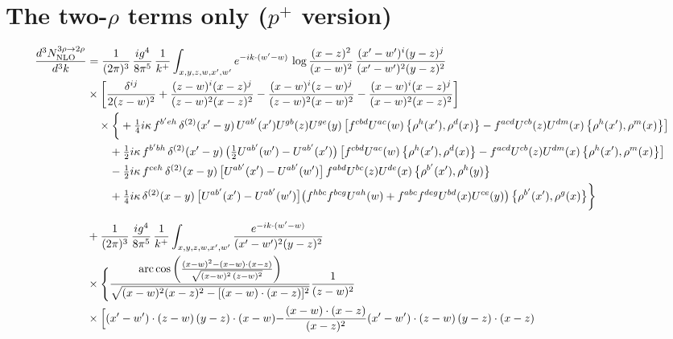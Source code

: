 \documentclass[10pt]{article}
\numberwithin{equation}{section}
\begin{document}
\section{The two-$\rho$ terms only ($p^{+}$ version)}
\begin{align}
\frac{d^{3}N^{3\rho\to2\rho}_{\rm NLO}}{d^{3}k}&=\frac{1}{(2\pi)^{3}}\,\frac{ig^{4}}{8\pi^{5}}\,\frac{1}{k^{+}}\int_{x,y,z,w,x^{\prime},w^{\prime}}e^{-ik\cdot(w^{\prime}-w)}\,\log\frac{(x-z)^{2}}{(x-w)^{2}}\,\frac{(x^{\prime}-w^{\prime})^{i}(y-z)^{j}}{(x^{\prime}-w^{\prime})^{2}(y-z)^{2}}\notag\\
&\times\bigg[\frac{\delta^{ij}}{2(z-w)^{2}}+\frac{(z-w)^{i}(x-z)^{j}}{(z-w)^{2}(x-z)^{2}}-\frac{(x-w)^{i}(z-w)^{j}}{(z-w)^{2}(x-w)^{2}}-\frac{(x-w)^{i}(x-z)^{j}}{(x-w)^{2}(x-z)^{2}}\bigg]\notag\\
&\quad\times\bigg\{+\tfrac14 i\kappa\,f^{b^{\prime}eh}\,\delta^{(2)}(x^{\prime}-y)\,U^{ab^{\prime}}(x^{\prime})U^{gb}(z)U^{ge}(y)\,\big[f^{cbd}U^{ac}(w)\,\big\{\rho^{h}(x^{\prime}),\rho^{d}(x)\big\}-f^{acd}U^{cb}(z)U^{dm}(x)\,\big\{\rho^{h}(x^{\prime}),\rho^{m}(x)\big\}\big]\notag\\
&\qquad+\tfrac12 i\kappa\,f^{b^{\prime}bh}\,\delta^{(2)}(x^{\prime}-y)\,\big(\tfrac12U^{ab^{\prime}}(w^{\prime})-U^{ab^{\prime}}(x^{\prime})\big)\,\big[f^{cbd}U^{ac}(w)\,\big\{\rho^{h}(x^{\prime}),\rho^{d}(x)\big\}-f^{acd}U^{cb}(z)U^{dm}(x)\,\big\{\rho^{h}(x^{\prime}),\rho^{m}(x)\big\}\big]\notag\\
&\qquad-\tfrac12 i\kappa\,f^{ceh}\,\delta^{(2)}(x-y)\,\big[U^{ab^{\prime}}(x^{\prime})-U^{ab^{\prime}}(w^{\prime})\big]\,f^{abd}U^{bc}(z)U^{de}(x)\,\big\{\rho^{b^{\prime}}(x^{\prime}),\rho^{h}(y)\big\}\notag\\
&\qquad+\tfrac14 i\kappa\,\delta^{(2)}(x-y)\,\big[U^{ab^{\prime}}(x^{\prime})-U^{ab^{\prime}}(w^{\prime})\big]\big(f^{hbc}f^{bcg}U^{ah}(w)+f^{abc}f^{deg}U^{bd}(x)U^{ce}(y)\big)\,\big\{\rho^{b^{\prime}}(x^{\prime}),\rho^{g}(x)\big\}\bigg\}\notag\\[6pt]
&+\frac{1}{(2\pi)^{3}}\,\frac{ig^{4}}{8\pi^{5}}\,\frac{1}{k^{+}}\int_{x,y,z,w,x^{\prime},w^{\prime}}\frac{e^{-ik\cdot(w^{\prime}-w)}}{(x^{\prime}-w^{\prime})^{2}(y-z)^{2}}\notag\\
&\times\Bigg\{\frac{\mathrm{arc\,cos}\left(\frac{(x-w)^{2}-(x-w)\cdot (x-z)}{\sqrt{(x-w)^{2}\,(z-w)^{2}}}\right)}{\sqrt{(x-w)^{2}(x-z)^{2}-[(x-w)\cdot(x-z)]^{2}}}\frac{1}{(z-w)^{2}}\notag\\
&\times\Big[{(x^{\prime}-w^{\prime})\cdot(z-w)\,(y-z)\cdot(x-w)}{-\frac{(x-w)\cdot(x-z)}{(x-z)^{2}}(x^{\prime}-w^{\prime})\cdot(z-w)\,(y-z)\cdot(x-z)}\notag\\

\end{align}
\end{document}
